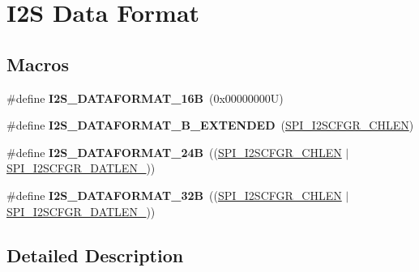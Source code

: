 \hypertarget{group___i2_s___data___format}{}\section{I2S Data Format}
\label{group___i2_s___data___format}
\subsection*{Macros}
\begin{DoxyCompactItemize}
\item 
\mbox{\label{group___i2_s___data___format_ga84607e206fe566512a525b9f0e361142}} 
\#define {\bfseries I2\+S\+\_\+\+D\+A\+T\+A\+F\+O\+R\+M\+A\+T\+\_\+16B}~(0x00000000\+U)
\item 
\mbox{\label{group___i2_s___data___format_ga7d247401de428096b986a1c88e494d71}} 
\#define {\bfseries I2\+S\+\_\+\+D\+A\+T\+A\+F\+O\+R\+M\+A\+T\+\_\+B\+\_\+\+E\+X\+T\+E\+N\+D\+ED}~(\hyperlink{group___peripheral___registers___bits___definition_ga9c362b3d703698a7891f032f6b29056f}{S\+P\+I\+\_\+\+I2\+S\+C\+F\+G\+R\+\_\+\+C\+H\+L\+EN})
\item 
\mbox{\label{group___i2_s___data___format_ga32b56d268efb591d0dfd437c68e21819}} 
\#define {\bfseries I2\+S\+\_\+\+D\+A\+T\+A\+F\+O\+R\+M\+A\+T\+\_\+24B}~((\hyperlink{group___peripheral___registers___bits___definition_ga9c362b3d703698a7891f032f6b29056f}{S\+P\+I\+\_\+\+I2\+S\+C\+F\+G\+R\+\_\+\+C\+H\+L\+EN} $\vert$ \hyperlink{group___peripheral___registers___bits___definition_gaa20ad624085d2e533eea3662cb03d8fa}{S\+P\+I\+\_\+\+I2\+S\+C\+F\+G\+R\+\_\+\+D\+A\+T\+L\+E\+N\+\_}))
\item 
\mbox{\label{group___i2_s___data___format_gac37d00c83e0bfc6dd21261cf94ff14c6}} 
\#define {\bfseries I2\+S\+\_\+\+D\+A\+T\+A\+F\+O\+R\+M\+A\+T\+\_\+32B}~((\hyperlink{group___peripheral___registers___bits___definition_ga9c362b3d703698a7891f032f6b29056f}{S\+P\+I\+\_\+\+I2\+S\+C\+F\+G\+R\+\_\+\+C\+H\+L\+EN} $\vert$ \hyperlink{group___peripheral___registers___bits___definition_gadf6e940d195fa1633cb1b23414f00412}{S\+P\+I\+\_\+\+I2\+S\+C\+F\+G\+R\+\_\+\+D\+A\+T\+L\+E\+N\+\_}))
\end{DoxyCompactItemize}


\subsection{Detailed Description}
